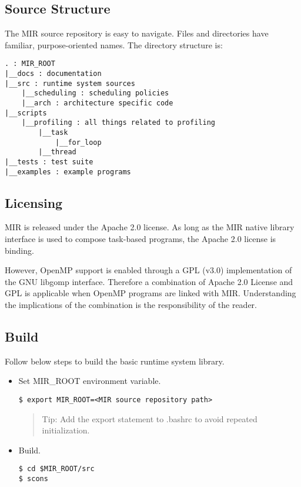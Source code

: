 \documentclass[11pt,a4paper]{article}
\begin{document}
\subsection{Source Structure}\label{source-structure}

The MIR source repository is easy to navigate. Files and directories have
familiar, purpose-oriented names. The directory structure is:

\begin{lstlisting}[style=MyInputStyle]
. : MIR_ROOT
|__docs : documentation
|__src : runtime system sources
    |__scheduling : scheduling policies
    |__arch : architecture specific code
|__scripts
    |__profiling : all things related to profiling
        |__task
            |__for_loop
        |__thread
|__tests : test suite
|__examples : example programs
\end{lstlisting}

\subsection{Licensing}\label{license}
MIR is released under the Apache 2.0 license.
As long as the MIR native library interface is used to compose task-based
programs, the Apache 2.0 license is binding.

However, OpenMP support is enabled through a GPL (v3.0) implementation
of the GNU libgomp interface. Therefore a combination of Apache 2.0 License and
GPL is applicable when OpenMP programs are linked with MIR. Understanding the
implications of the combination is the responsibility of the reader.

\subsection{Build}\label{build}

Follow below steps to build the basic runtime system library.

\begin{itemize}
    \item Set MIR\_ROOT environment variable.

\begin{lstlisting}[style=MyInputStyle]
$ export MIR_ROOT=<MIR source repository path>
\end{lstlisting}

\begin{framed}
\begin{quote}
Tip: Add the export statement to .bashrc to avoid repeated initialization.
\end{quote}
\end{framed}

    \item Build.

\begin{lstlisting}[style=MyInputStyle]
$ cd $MIR_ROOT/src
$ scons
\end{lstlisting}
\end{itemize}
\end{document}
